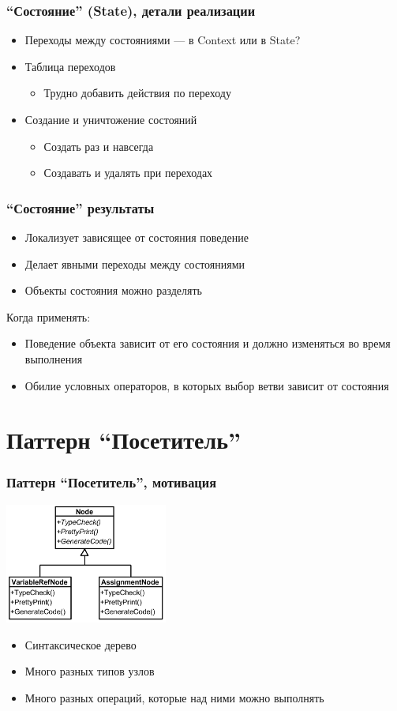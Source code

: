 \documentclass[xetex,mathserif,serif]{beamer}
\begin{document}
	\begin{frame}
		\frametitle{``Состояние'' (State), детали реализации}
		\begin{itemize}
			\item Переходы между состояниями --- в Context или в State?
			\item Таблица переходов
			\begin{itemize}
				\item Трудно добавить действия по переходу
			\end{itemize}
			\item Создание и уничтожение состояний
			\begin{itemize}
				\item Создать раз и навсегда
				\item Создавать и удалять при переходах
			\end{itemize}
		\end{itemize}
	\end{frame}

	\begin{frame}
		\frametitle{``Состояние'' результаты}
		\begin{itemize}
			\item Локализует зависящее от состояния поведение
			\item Делает явными переходы между состояниями
			\item Объекты состояния можно разделять
		\end{itemize}
		Когда применять:
		\begin{itemize}
			\item Поведение объекта зависит от его состояния и должно изменяться во время выполнения
			\item Обилие условных операторов, в которых выбор ветви зависит от состояния
		\end{itemize}
	\end{frame}

	\section{Паттерн ``Посетитель''}

	\begin{frame}
		\frametitle{Паттерн ``Посетитель'', мотивация}
		\begin{center}
			\includegraphics[width=0.4\textwidth]{visitorExample.png}
		\end{center}
		\begin{itemize}
			\item Синтаксическое дерево
			\item Много разных типов узлов
			\item Много разных операций, которые над ними можно выполнять
		\end{itemize}
	\end{frame}
\end{document}
